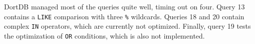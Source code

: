 DortDB managed most of the queries quite well, timing out on four. Query 13 contains a \texttt{LIKE} comparison with three \texttt{\%} wildcards. Queries 18 and 20 contain complex \texttt{IN} operators, which are currently not optimized. Finally, query 19 tests the optimization of \texttt{OR} conditions, which is also not implemented.